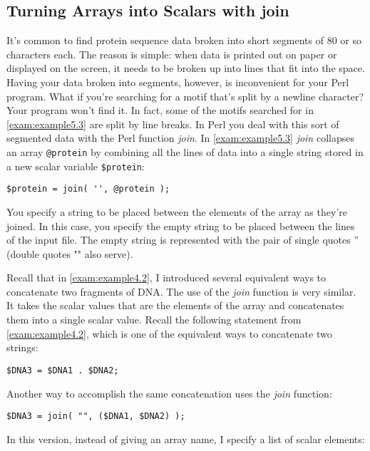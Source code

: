 \subsection{Turning Arrays into Scalars with join}
\label{sect:section5.3.2}
It's common to find protein sequence data broken into short segments of 80 or so characters each. The reason is simple: when data is printed out on paper or displayed on the screen, it needs to be broken up into lines that fit into the space. Having your data broken into segments, however, is inconvenient for your Perl program. What if you're searching for a motif that's split by a newline character? Your program won't find it. In fact, some of the motifs searched for in \autoref{exam:example5.3} are split by line breaks. In Perl you deal with this sort of segmented data with the Perl function \textit{join}. In \autoref{exam:example5.3} \textit{join} collapses an array \verb|@protein| by combining all the lines of data into a single string stored in a new scalar variable \verb|$protein|:

\begin{lstlisting}
$protein = join( '', @protein );
\end{lstlisting}

You specify a string to be placed between the elements of the array as they're joined. In this case, you specify the empty string to be placed between the lines of the input file. The empty string is represented with the pair of single quotes '' (double quotes "" also serve).  

Recall that in \autoref{exam:example4.2}, I introduced several equivalent ways to concatenate two fragments of DNA. The use of the \textit{join} function is very similar. It takes the scalar values that are the elements of the array and concatenates them into a single scalar value. Recall the following statement from \autoref{exam:example4.2}, which is one of the equivalent ways to concatenate two strings: 

\begin{lstlisting}
$DNA3 = $DNA1 . $DNA2;
\end{lstlisting}

Another way to accomplish the same concatenation uses the \textit{join} function:

\begin{lstlisting}
$DNA3 = join( "", ($DNA1, $DNA2) );
\end{lstlisting}

In this version, instead of giving an array name, I specify a list of scalar elements:

